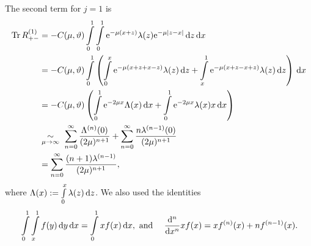 The second term for $j=1$ is
\begin{align*}
    \Tr R^{(1)}_{+-} &= -C(\mu,\theta)
        \Integ[1]{0}{x}{
            \Integ[1]{0}{z}{\Eto{-\mu(x+z)}
                \lambda(z)\Eto{-\mu\left|z-x\right|}
            }
        } \\
        &= -C(\mu,\theta)
            \Integ[1]{0}{x}{\left(
                \Integ[x]{0}{z}{
                    \Eto{-\mu(x+z+x-z)} \lambda(z)
                }
                +
                \Integ[1]{x}{z}{
                    \Eto{-\mu(x+z-x+z)} \lambda(z)
                }
                \right)
            } \\
        &= -C(\mu,\theta) \left(
            \Integ[1]{0}{x}{\Eto{-2\mu x} \Lambda(x)}
            + \Integ[1]{0}{x}{\Eto{-2\mu x}\lambda(x)x}
            \right) \\
        &\SimAs{\mu\to\infty}\ 
            \sum_{n=0}^\infty \frac{\Lambda^{(n)}(0)}{(2\mu)^{n+1}}
            + \sum_{n=0}^\infty \frac{n\lambda^{(n-1)}(0)}{(2\mu)^{n+1}} \\
        &= \sum_{n=0}^\infty \frac{(n+1)\lambda^{(n-1)}}{(2\mu)^{n+1}},
\end{align*}
where $\Lambda(x) := \Integ[x]{0}{z}{\lambda(z)}$. We also used the identities
\begin{align*}
    &\Integ[1]{0}{x}{\Integ[1]{x}{y}{f(y)}} = \Integ[1]{0}{x}{xf(x)},
    \text{ and }
    &\frac{\mathrm d^n}{\mathrm dx^n}xf(x) = xf^{(n)}(x) + nf^{(n-1)}(x).
\end{align*}

